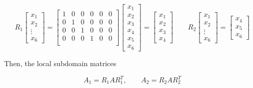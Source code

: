 \begin{equation*}
    R_1
    \begin{bmatrix}
        x_1\\x_2\\\vdots\\x_6
    \end{bmatrix}
=
\begin{bmatrix}
        1 & 0 & 0 & 0 & 0 & 0\\
        0 & 1 & 0 & 0 & 0 & 0\\
        0 & 0 & 1 & 0 & 0 & 0\\
        0 & 0 & 0 & 1 & 0 & 0\\
\end{bmatrix}
    \begin{bmatrix}
        x_1\\x_2\\x_3\\ x_4\\ x_5 \\x_6
    \end{bmatrix}
    =
    \begin{bmatrix}
        x_1\\x_2\\x_3\\ x_4
    \end{bmatrix}
    \qquad
    R_2
    \begin{bmatrix}
        x_1\\x_2\\\vdots\\x_6
    \end{bmatrix}
    =
    \begin{bmatrix}
        x_4\\x_5\\x_6
    \end{bmatrix}
\end{equation*}

Then, the local subdomain matrices

\begin{equation*}
    A_1 = R_1 A R_1^T, \qquad A_2 = R_2AR_2^T
\end{equation*}



